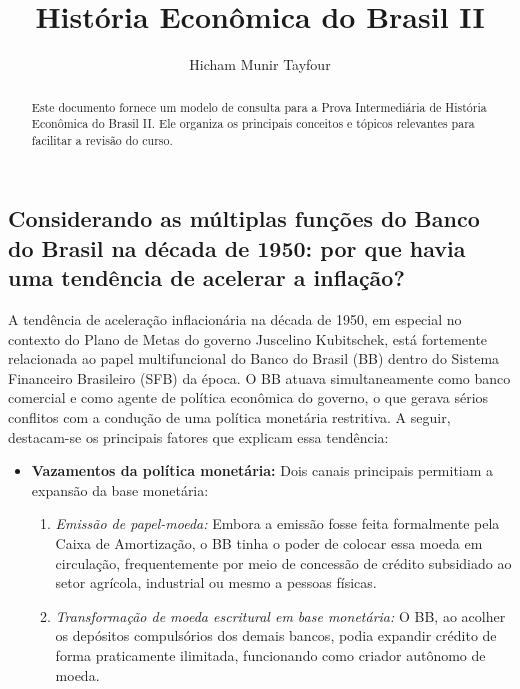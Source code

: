 \documentclass{sciposter}
\title{História Econômica do Brasil II}
\author{Hicham Munir Tayfour}
\institute 
{Bacharelado em Economia\\
Insper - Instituto de Ensino e Pesquisa\\
São Paulo, Brasil}
\begin{document}

\maketitle

\begin{multicols}{3}
\fontsize{17pt}{7pt}\selectfont

\begin{abstract}
Este documento fornece um modelo de consulta para a Prova Intermediária de História Econômica do Brasil II. Ele organiza os principais conceitos e tópicos relevantes para facilitar a revisão do curso.
\end{abstract}



\section{\textbf{Considerando as múltiplas funções do Banco do Brasil na década de 1950: por que havia uma tendência de acelerar a inflação?}}

A tendência de aceleração inflacionária na década de 1950, em especial no contexto do Plano de Metas do governo Juscelino Kubitschek, está fortemente relacionada ao papel multifuncional do Banco do Brasil (BB) dentro do Sistema Financeiro Brasileiro (SFB) da época. O BB atuava simultaneamente como banco comercial e como agente de política econômica do governo, o que gerava sérios conflitos com a condução de uma política monetária restritiva. A seguir, destacam-se os principais fatores que explicam essa tendência:

\begin{itemize}
    \item \textbf{Vazamentos da política monetária:} 
    Dois canais principais permitiam a expansão da base monetária:
    \begin{enumerate}
        \item \textit{Emissão de papel-moeda:} Embora a emissão fosse feita formalmente pela Caixa de Amortização, o BB tinha o poder de colocar essa moeda em circulação, frequentemente por meio de concessão de crédito subsidiado ao setor agrícola, industrial ou mesmo a pessoas físicas.
        \item \textit{Transformação de moeda escritural em base monetária:} O BB, ao acolher os depósitos compulsórios dos demais bancos, podia expandir crédito de forma praticamente ilimitada, funcionando como criador autônomo de moeda.
    \end{enumerate}


\end{itemize}
\end{multicols}
\end{document}
